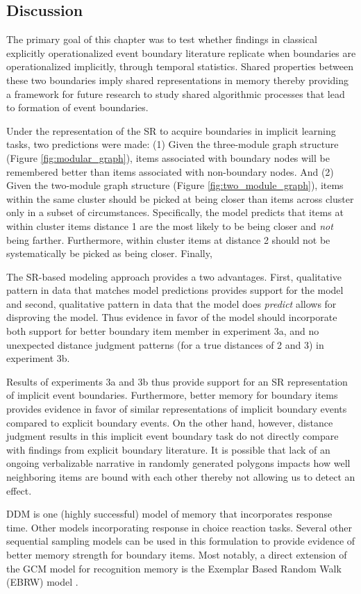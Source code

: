 \subsection{Discussion}

The primary goal of this chapter was to test whether findings in classical explicitly operationalized event boundary literature replicate when boundaries are operationalized implicitly, through temporal statistics. Shared properties between these two boundaries imply shared representations in memory thereby providing a framework for future research to study shared algorithmic processes that lead to formation of event boundaries. 

Under the representation of the SR to acquire boundaries in implicit learning tasks, two predictions were made: (1) Given the three-module graph structure (Figure \ref{fig:modular_graph}), items associated with boundary nodes will be remembered better than items associated with non-boundary nodes. And (2) Given the two-module graph structure (Figure \ref{fig:two_module_graph}), items within the same cluster should be picked at being closer than items across cluster only in a subset of circumstances. Specifically, the model predicts that items at within cluster items distance 1 are the most likely to be being closer and \textit{not} being farther. Furthermore, within cluster items at distance 2 should not be systematically be picked as being closer. Finally, 

The SR-based modeling approach provides a two advantages. First, qualitative pattern in data that matches model predictions provides support for the model and second, qualitative pattern in data that the model does \textit{predict} allows for disproving the model. Thus evidence in favor of the model should incorporate both support for better boundary item member in experiment 3a, and no unexpected distance judgment patterns (for a true distances of 2 and 3) in experiment 3b.

Results of experiments 3a and 3b thus provide support for an SR representation of implicit event boundaries. Furthermore, better memory for boundary items provides evidence in favor of similar representations of implicit boundary events compared to explicit boundary events. On the other hand, however, distance judgment results in this implicit event boundary task do not directly compare with findings from explicit boundary literature. It is possible that lack of an ongoing verbalizable narrative in randomly generated polygons impacts how well neighboring items are bound with each other thereby not allowing us to detect an effect.

DDM is one (highly successful) model of memory that incorporates response time. Other models incorporating response in choice reaction tasks. Several other sequential sampling models can be used in this formulation to provide evidence of better memory strength for boundary items. Most notably, a direct extension of the GCM model for recognition memory is the Exemplar Based Random Walk (EBRW) model \cite{nosofsky2011short}. 